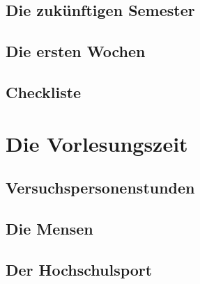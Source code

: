 \documentclass[12pt, a4paper]{article}
\newif\ifinfo
\begin{document}
	\subsection{Die zukünftigen Semester}
	

	\pagebreak

%	
\fi

\subsection{Die ersten Wochen} 


\pagebreak

\subsection{Checkliste}



\ifinfo
        \vspace{-1em} %
\fi
\section{Die Vorlesungszeit}
\ifinfo
	\subsection{Der Stundenplan}
	
	
\else
	\subsection{Versuchspersonenstunden}
	
\fi

\subsection{Die Mensen}


\subsection{Der Hochschulsport}

\end{document}
